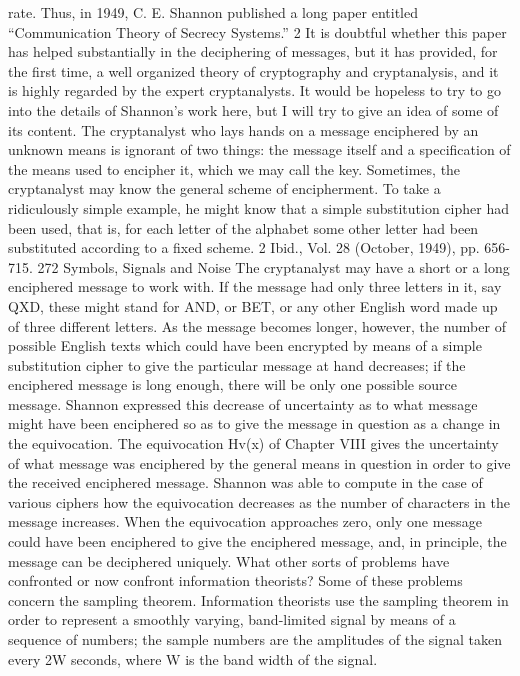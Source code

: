 {{{{{{{{{{{{rate. Thus, in 1949, C. E. Shannon published a long paper entitled
“Communication Theory of Secrecy Systems.” 2 It is doubtful
whether this paper has helped substantially in the deciphering of
messages, but it has provided, for the first time, a well organized
theory of cryptography and cryptanalysis, and it is highly regarded
by the expert cryptanalysts.
It would be hopeless to try to go into the details of Shannon’s
work here, but I will try to give an idea of some of its content.
The cryptanalyst who lays hands on a message enciphered by
an unknown means is ignorant of two things: the message itself
and a specification of the means used to encipher it, which we may
call the key.
Sometimes, the cryptanalyst may know the general scheme of
encipherment. To take a ridiculously simple example, he might
know that a simple substitution cipher had been used, that is, for
each letter of the alphabet some other letter had been substituted
according to a fixed scheme.
2 Ibid., Vol. 28 (October, 1949), pp. 656-715.
272
Symbols, Signals and Noise
The cryptanalyst may have a short or a long enciphered message
to work with. If the message had only three letters in it, say QXD,
these might stand for AND, or BET, or any other English word
made up of three different letters. As the message becomes longer,
however, the number of possible English texts which could have
been encrypted by means of a simple substitution cipher to give the
particular message at hand decreases; if the enciphered message
is long enough, there will be only one possible source message.
Shannon expressed this decrease of uncertainty as to what message
might have been enciphered so as to give the message in
question as a change in the equivocation. The equivocation Hv(x)
of Chapter VIII gives the uncertainty of what message was
enciphered by the general means in question in order to give the
received enciphered message. Shannon was able to compute in the
case of various ciphers how the equivocation decreases as the
number of characters in the message increases. When the equivocation
approaches zero, only one message could have been enciphered
to give the enciphered message, and, in principle, the
message can be deciphered uniquely.
What other sorts of problems have confronted or now confront
information theorists? Some of these problems concern the sampling
theorem. Information theorists use the sampling theorem in
order to represent a smoothly varying, band-limited signal by
means of a sequence of numbers; the sample numbers are the
amplitudes of the signal taken every \/2W seconds, where W is
the band width of the signal.
}}}}}}}}}}}}
